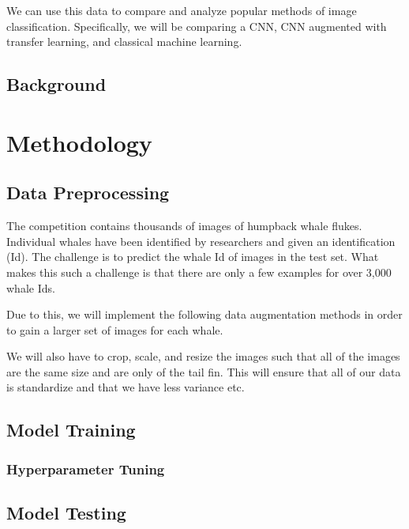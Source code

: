 \documentclass[paper=a4, fontsize=11pt]{scrartcl}
\numberwithin{equation}{section}		%
\numberwithin{table}{section}				%
\begin{document}
We can use this data to compare and analyze popular methods of image classification. Specifically, we will be comparing a CNN, CNN augmented with transfer learning, and classical machine learning.

\subsection{Background}\label{sec: background}

\section{Methodology}\label{sec: meth}
\subsection{Data Preprocessing}

The competition contains thousands of images of humpback whale flukes. Individual whales have been identified by researchers and given an identification (Id). The challenge is to predict the whale Id of images in the test set. What makes this such a challenge is that there are only a few examples for over 3,000 whale Ids.

Due to this, we will implement the following data augmentation methods in order to gain a larger set of images for each whale.

We will also have to crop, scale, and resize the images such that all of the images are the same size and are only of the tail fin. This will ensure that all of our data is standardize and that we have less variance etc.

\subsection{Model Training}

\subsubsection{Hyperparameter Tuning}

\subsection{Model Testing}
\end{document}
